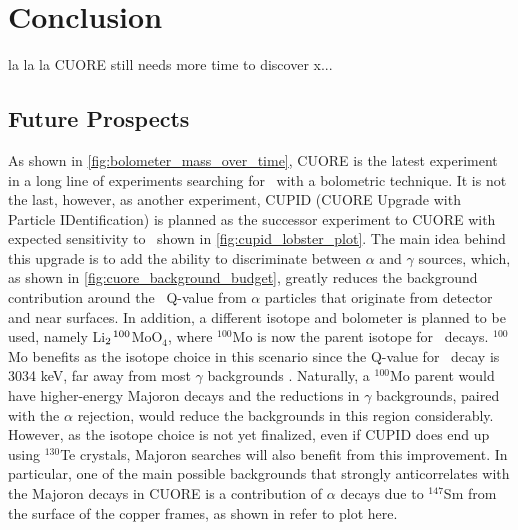 \chapter{Conclusion}
la la la CUORE still needs more time to discover x...

\section{Future Prospects}
As shown in \autoref{fig:bolometer_mass_over_time}, CUORE is the latest experiment in a long line of experiments searching for \zeronubb~with a bolometric technique.
It is not the last, however, as another experiment, CUPID (CUORE Upgrade with Particle IDentification) is planned as the successor experiment to CUORE with expected sensitivity to \zeronubb~shown in \autoref{fig:cupid_lobster_plot}.
The main idea behind this upgrade is to add the ability to discriminate between $\alpha$ and $\gamma$ sources, which, as shown in \autoref{fig:cuore_background_budget}, greatly reduces the background contribution around the \zeronubb~Q-value from $\alpha$ particles that originate from detector and near surfaces.
In addition, a different isotope and bolometer is planned to be used, namely Li$_2\kern 0.1em^{100}$MoO$_4$, where $^{100}$Mo is now the parent isotope for \zeronubb~decays.
${^100}$Mo benefits as the isotope choice in this scenario since the Q-value for \zeronubb~decay is 3034 keV, far away from most $\gamma$ backgrounds \cite{Rahaman:2007ng}.
Naturally, a $^{100}$Mo parent would have higher-energy Majoron decays and the reductions in $\gamma$ backgrounds, paired with the $\alpha$ rejection, would reduce the backgrounds in this region considerably.
However, as the isotope choice is not yet finalized, even if CUPID does end up using $^{130}$Te crystals, Majoron searches will also benefit from this improvement.
In particular, one of the main possible backgrounds that strongly anticorrelates with the Majoron decays in CUORE is a contribution of $\alpha$ decays due to $^{147}$Sm from the surface of the copper frames, as shown in \color{red}refer to plot here\color{black}.

